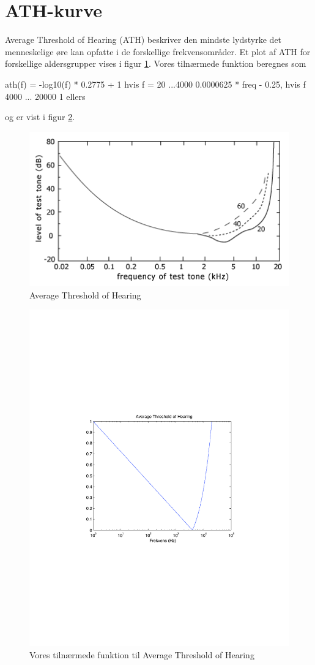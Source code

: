 \section{ATH-kurve}
Average Threshold of Hearing (ATH) beskriver den mindste lydstyrke det menneskelige øre kan opfatte i de forskellige frekvensområder. Et plot af ATH for forskellige aldersgrupper vises i figur \ref{fig.ath}. Vores tilnærmede funktion beregnes som

ath(f) = 
-log10(f) * 0.2775 + 1 hvis f = 20 ...4000
0.0000625 * freq - 0.25, hvis f 4000 ... 20000  
1 ellers

og er vist i figur \ref{fig.vores-ath}.


\begin{figure}[h!]
\begin{center}
\includegraphics[width=12cm]{ATH}
\end{center}
\caption{Average Threshold of Hearing}
\label{fig.ath}
\end{figure}

\begin{figure}[h!]
\begin{center}
\includegraphics[width=12cm]{vores-ath}
\end{center}
\caption{Vores tilnærmede funktion til Average Threshold of Hearing}
\label{fig.vores-ath}
\end{figure}

